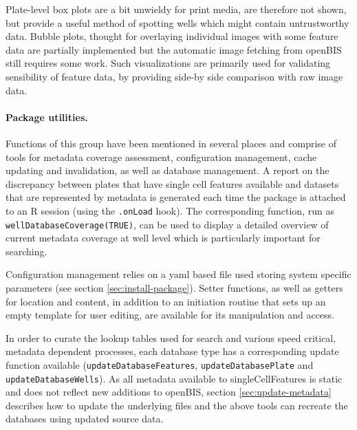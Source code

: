 Plate-level box plots are a bit unwieldy for print media, are therefore not shown, but provide a useful method of spotting wells which might contain untrustworthy data. Bubble plots, thought for overlaying individual images with some feature data are partially implemented but the automatic image fetching from openBIS still requires some work. Such visualizations are primarily used for validating sensibility of feature data, by providing side-by side comparison with raw image data.



\paragraph{Package utilities.}
Functions of this group have been mentioned in several places and comprise of tools for metadata coverage assessment, configuration management, cache updating and invalidation, as well as database management. A report on the discrepancy between plates that have single cell features available and datasets that are represented by metadata is generated each time the package is attached to an R session (using the \texttt{.onLoad} hook). The corresponding function, run as \texttt{wellDatabaseCoverage(TRUE)}, can be used to display a detailed overview of current metadata coverage at well level which is particularly important for searching.

Configuration management relies on a yaml based file used storing system specific parameters (see section \ref{sec:install-package}). Setter functions, as well as getters for location and content, in addition to an initiation routine that sets up an empty template for user editing, are available for its manipulation and access.

In order to curate the lookup tables used for search and various speed critical, metadata dependent processes, each database type has a corresponding update function available (\texttt{updateDatabaseFeatures}, \texttt{updateDatabasePlate} and \texttt{updateDatabaseWells}). As all metadata available to singleCellFeatures is static and does not reflect new additions to openBIS, section \ref{sec:update-metadata} describes how to update the underlying files and the above tools can recreate the databases using updated source data.

